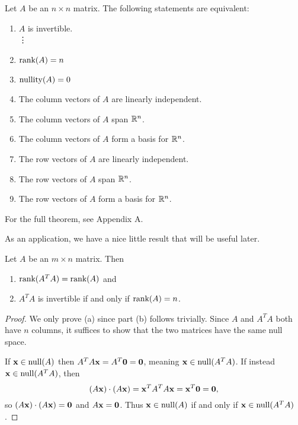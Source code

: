 \documentclass[../m073main.tex]{subfiles}
\begin{document}
\begin{theorem}
	Let $A$ be an $n\times n$ matrix.
	The following statements are equivalent:
	\begin{enumerate}[label=(\alph*)]
		\item $A$ is invertible. \\
		\phantom{~}\hspace{-19.5pt} \vdots
		\setcounter{enumi}{5}		
		\item $\textrm{rank}(A) = n$
		\item $\textrm{nullity}(A) = 0$
		\item The column vectors of $A$ are linearly independent.
		\item The column vectors of $A$ span $\mathbb{R}^n$.
		\item The column vectors of $A$ form a basis for $\mathbb{R}^n$.
		\item The row vectors of $A$ are linearly independent.
		\item The row vectors of $A$ span $\mathbb{R}^n$.
		\item The row vectors of $A$ form a basis for $\mathbb{R}^n$.
	\end{enumerate}
	For the full theorem, see Appendix A.
\end{theorem}

As an application, we have a nice little result that will be useful later.

\begin{theorem}
	Let $A$ be an $m\times n$ matrix.
	Then
	\begin{enumerate}[label=(\alph*)]
		\item $\textrm{rank}(A^TA) = \textrm{rank}(A)$ and
		\item $A^TA$ is invertible if and only if $\textrm{rank}(A) = n$.
	\end{enumerate}
\end{theorem}

\begin{proof}
	We only prove (a) since part (b) follows trivially.
	Since $A$ and $A^TA$ both have $n$ columns, it suffices to show that the two matrices have the same null space.

	If $\mathbf{x} \in \textrm{null}(A)$ then $A^T A \mathbf{x} = A^T \mathbf{0} = \mathbf{0}$, meaning $\mathbf{x} \in \textrm{null} (A^TA)$.
	If instead $\mathbf{x} \in \textrm{null} (A^T A)$, then
	\[ (A \mathbf{x}) \cdot (A \mathbf{x}) = \mathbf{x}^T A^T A \mathbf{x} = \mathbf{x}^T \mathbf{0} = \mathbf{0}, \]
	so $(A \mathbf{x}) \cdot (A \mathbf{x}) = \mathbf{0}$ and $A \mathbf{x} = \mathbf{0}$.
	Thus $\mathbf{x} \in \textrm{null}(A)$ if and only if $\mathbf{x} \in \textrm{null}(A^T A)$.
\end{proof}
\end{document}
